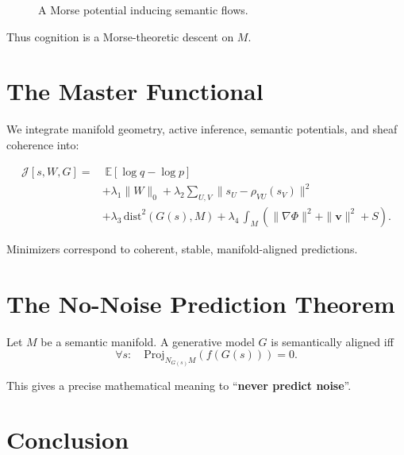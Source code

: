 \documentclass[11pt,a4paper,twocolumn]{article}
\begin{document}
\begin{figure}[H]
\centering
{}
\caption{A Morse potential inducing semantic flows.}
\end{figure}

Thus cognition is a Morse-theoretic descent on $M$.

\section{The Master Functional}

We integrate manifold geometry,
active inference,
semantic potentials,
and sheaf coherence into:

\begin{align*}
\mathcal{J}[s,W,G]
= &
\; \mathbb{E}[\log q - \log p] \\
&+ \lambda_1 \|W\|_0
+ \lambda_2 \sum_{U,V} \|s_U - \rho_{VU}(s_V)\|^2 \\
&+ \lambda_3\, \mathrm{dist}^2(G(s),M)
+ \lambda_4\, \int_M (\|\nabla\Phi\|^2+\|\mathbf v\|^2+S).
\end{align*}

Minimizers correspond to
coherent, stable, manifold-aligned predictions.

\section{The No-Noise Prediction Theorem}

\begin{theorem}
Let $M$ be a semantic manifold.
A generative model $G$ is semantically aligned iff
\[
\forall s:\quad
\mathrm{Proj}_{N_{G(s)}M}(f(G(s))) = 0.
\]
\end{theorem}

This gives a precise mathematical meaning to
``\textbf{never predict noise}''.

\section{Conclusion}
\end{document}
